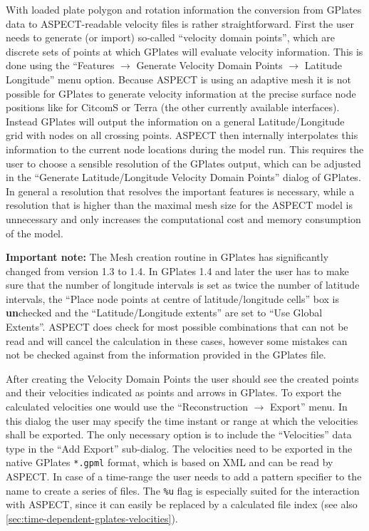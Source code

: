 \documentclass{article}
\newcommand{\aspect}{\textsc{ASPECT}}
\begin{document}
With loaded plate polygon and rotation information the conversion from GPlates
data to \aspect{}-readable velocity files is rather straightforward. First the
user needs to generate (or import) so-called ``velocity domain points'', which
are discrete sets of points at which GPlates will evaluate velocity
information. This is done using the ``Features $\rightarrow$ Generate Velocity
Domain Points $\rightarrow$ Latitude Longitude'' menu option. Because \aspect{}
is using an adaptive mesh it is not possible for GPlates to generate velocity
information at the precise surface node positions like for CitcomS or Terra (the
other currently available interfaces). Instead GPlates will output the
information on a general Latitude/Longitude grid with nodes on all crossing
points. \aspect{} then internally interpolates this information to the current
node locations during the model run. This requires the user to
choose a sensible resolution of the GPlates output, which can be adjusted in
the ``Generate Latitude/Longitude Velocity Domain Points'' dialog of GPlates. In
general a resolution that resolves the important features is necessary, while a
resolution that is higher than the maximal mesh size for the \aspect{}
model is unnecessary and only increases the computational cost and memory consumption of
the model. 

\textbf{Important note:} The Mesh creation routine in GPlates has significantly 
changed from version 1.3 to 1.4. In GPlates 1.4 and later the user has to make 
sure that the number of longitude intervals is set as twice the number of 
latitude intervals, the ``Place node points at centre of latitude/longitude
cells'' box is \textbf{un}checked and the ``Latitude/Longitude extents'' are set
to ``Use Global Extents''. \aspect{} does check for most possible combinations that
can not be read and will cancel the calculation in these cases, however some
mistakes can not be checked against from the information provided in the GPlates file.

After creating the Velocity Domain Points the user should see the
created points and their velocities indicated as points and arrows in GPlates.
To export the calculated velocities one would use the ``Reconstruction
$\rightarrow$ Export'' menu. In this dialog the user may specify the time
instant or range at which the velocities shall be exported. The only necessary option is
to include the ``Velocities'' data type in the ``Add Export'' sub-dialog. The
velocities need to be exported in the native GPlates \texttt{*.gpml} format,
which is based on XML and can be read by \aspect{}. In case of a time-range the
user needs to add a pattern specifier to the name to create a series of files.
The \texttt{\%u} flag is especially suited for the interaction with \aspect{},
since it can easily be
replaced by a calculated file index (see also
\ref{sec:time-dependent-gplates-velocities}).
\end{document}
